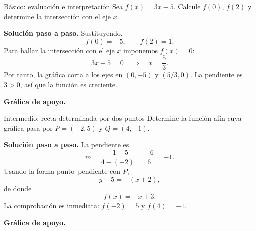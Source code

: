 \documentclass[aspectratio=169,10pt]{beamer}
\begin{document}
\begin{frame}{Básico: evaluación e interpretación}
Sea $f(x)=3x-5$. Calcule $f(0)$, $f(2)$ y determine la intersección con el eje $x$.

\textbf{Solución paso a paso.} Sustituyendo,
\[
f(0)=-5,\qquad f(2)=1.
\]
Para hallar la intersección con el eje $x$ imponemos $f(x)=0$:
\[
3x-5=0\quad\Longrightarrow\quad x=\frac53.
\]
Por tanto, la gráfica corta a los ejes en $(0,-5)$ y $(5/3,0)$. La pendiente es $3>0$, así que la función es creciente.


\textbf{Gráfica de apoyo.}\medskip
\begin{center}
\end{center}

\end{frame}

\begin{frame}{Intermedio: recta determinada por dos puntos}
Determine la función afín cuya gráfica pasa por $P=(-2,5)$ y $Q=(4,-1)$.

\textbf{Solución paso a paso.} La pendiente es
\[
m=\frac{-1-5}{4-(-2)}=\frac{-6}{6}=-1.
\]
Usando la forma punto--pendiente con $P$,
\[
y-5=-(x+2),
\]
de donde
\[
\boxed{f(x)=-x+3}.
\]
La comprobación es inmediata: $f(-2)=5$ y $f(4)=-1$.


\textbf{Gráfica de apoyo.}\medskip
\begin{center}
\end{center}

\end{frame}
\end{document}
